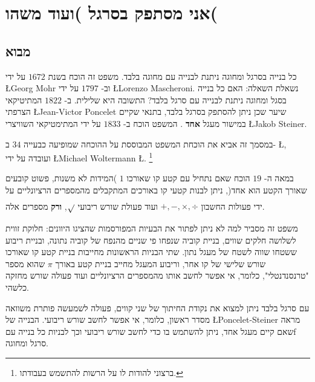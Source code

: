 

\chapter{אני מסתפק בסרגל )ועוד משהו(}


\section{%
מבוא
}\label{s.intro}

כל בנייה בסרגל ומחוגה ניתנת לבנייה עם מחוגה בלבד. משפט זה הוכח בשנת 
$1672$
על ידי
\L{Georg Mohr}
וב-
$1797$
על ידי
\L{Lorenzo Mascheroni}.
נשאלת השאלה: האם כל בנייה בסגל ומחוגה ניתנת לבנייה עם סרגל בלבד? התשובה היא שלילית. ב-
$1822$
המתיטיקאי הצרפתי
\L{Jean-Victor Poncelet}
שיער שכן ניתן להסתפק בסרגל בלבד, בתנאי שקיים במישור מעגל
\textbf{%
אחד%
}.
המשפט הוכח ב-
$1833$
על ידי המתימטיקאי השוויצרי
\L{Jakob Steiner}.

במסמך זה אביא את הוכחת המשפט המבוססת על ההוכחה שמופיעה כבעייה
$34$
ב-%
\L{\cite{dorrie1}},
ועובדה על ידי
\L{Michael Woltermann} \L{\cite{dorrie2}}.%
\footnote{%
ברצוני להודות לו על הרשות להתשמש בעבודתו.
}



במאה ה-
$19$
הוכח שאם נתחיל עם קטע קו שאורכו 
$1$
)המידות לא משנות, פשוט קובעים שאורך הקטע הוא אחד(, ניתן לבנות קטעי קו באורכים המתקבלים מהמספרים הרציונליים על ידי פעולות החשבון 
$+,-,\times,\div$
ועוד פעולת שורש ריבועי 
$\rule[-5pt]{0pt}{20pt}\sqrt{}$,
\textbf{%
ורק%
}
מספרים אלה.

משפט זה מסביר למה לא ניתן לפתור את הבעיות המפורסמות שהציגו היוונים: חלוקת זווית לשלושה חלקים שווים, בניית קוביה שנפחו פי שניים מהנפח של קוביה נתונה, ובניית ריבוע ששטחו שווה לשטח של מעגל נתון. שתי הבניות הראשונות מחייבות בניית קטע קו שאורכו שורש שלישי של קו אחר, וריבוע המעגל מחייב בניית קטע באורך
$\pi$
שהוא מספר "טרנסנדנטלי", כלומר, אי אפשר לחשב אותו מהמספרים הרציונליים ועוד פעולה שורש מחזקה כלשהי.

עם סרגל בלבד ניתן למצוא את נקודת החיתוך של שני קווים, פעולה לשמעשה פותרת משוואה מסדר ראשון, כלומר, אי אפשר לחשב שורש ריבועי. הבנייה של
\L{Poncelet-Steiner}
מראה שאם קיים מעגל אחד, ניתן להשתמש בו כדי לחשב שורש ריבועי וכך לבניות כל בנייה עםf סרגל ומחוגה.


